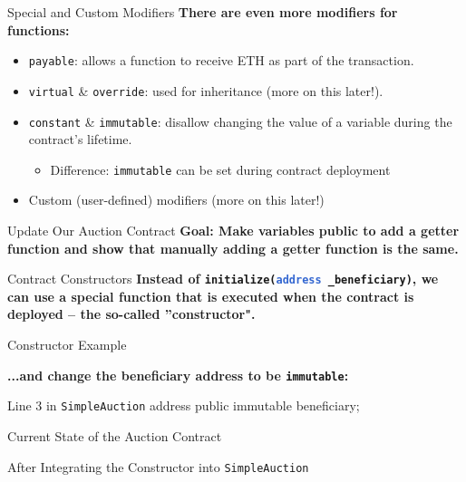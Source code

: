 \documentclass[]{beamer}
\begin{document}
\begin{frame}{Special and Custom Modifiers}
\textbf{There are even more modifiers for functions:}
	\begin{itemize}
		\item<1-> \texttt{payable}: allows a function to receive ETH as part of the transaction.
		\item<2-> \texttt{virtual} \& \texttt{override}: used for inheritance (\textcolor{focus}{more on this later!}).
		\item<3-> \texttt{constant} \& \texttt{immutable}: disallow changing the value of a variable during the contract's lifetime.
		\begin{itemize}
			\item<3->{Difference: \texttt{immutable} can be set during contract deployment}	
		\end{itemize}
		\item<4-> Custom (user-defined) modifiers (\textcolor{focus}{more on this later!})
	\end{itemize}
\end{frame}

\begin{frame}{Update Our Auction Contract}
	\textbf{Goal: Make variables public to add a getter function and show that manually adding a getter function is the same.}
	
\end{frame}

\begin{frame}{Contract Constructors}
	\textbf{Instead of \texttt{initialize(\textcolor{highlight}{address} \_beneficiary)}, we can use a special function that is executed when the contract is deployed -- the so-called ''constructor".}

	\begin{samplecode}{Constructor Example}
			
	\end{samplecode}
	
	
	\textbf{...and change the beneficiary address to be \texttt{immutable}:}
	\begin{samplecode}{Line 3 in \texttt{SimpleAuction}}
		address public immutable beneficiary;
	\end{samplecode}
\end{frame}

\begin{frame}{Current State of the Auction Contract}
	\begin{samplecode}{After Integrating the Constructor into \texttt{SimpleAuction}}
		
	\end{samplecode}
\end{frame}
\end{document}
